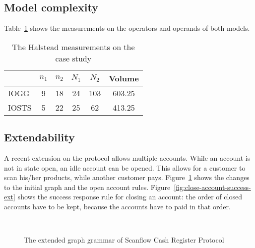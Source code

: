 \subsection{Model complexity}
\begin{comment}
start:
\end{comment}

Table~\ref{tab:halstead-scrp} shows the measurements on the operators and operands of both models.

\begin{table}[ht]
\begin{center}
\begin{tabular}{| l | c | c | c | c | c |}
  \hline
  & $n_1$ & $n_2$ & $N_1$ & $N_2$ & Volume \\ \hline
  IOGG & 9 & 18 & 24 & 103 & 603.25 \\ \hline
  IOSTS & 5 & 22 & 25 & 62 & 413.25 \\
  \hline
\end{tabular}
\end{center}
\caption{The Halstead measurements on the case study}
\label{tab:halstead-scrp}
\end{table}

\subsection{Extendability}
A recent extension on the protocol allows multiple accounts. While an account is not in state open, an idle account can be opened. This allows for a customer to scan his/her products, while another customer pays. Figure~\ref{fig:gg-fwgc-extended} shows the changes to the initial graph and the open account rules. Figure~\ref{fig:close-account-success-ext} shows the success response rule for closing an account: the order of closed accounts have to be kept, because the accounts have to paid in that order.

\begin{figure}[ht]
  \begin{center}
    \hspace{20px}
    \\
    \hspace{20px}
  \end{center}
  \caption{The extended graph grammar of Scanflow Cash Register Protocol}
  \label{fig:gg-fwgc-extended}
\end{figure}
